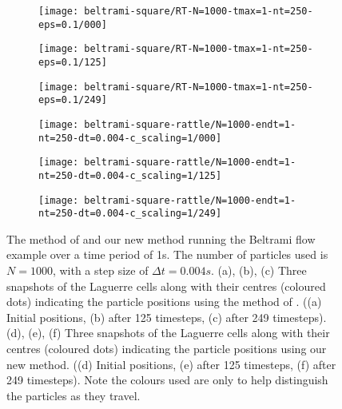 \documentclass[11pt, oneside]{article}   	%
\newcommand{\dt}{\Delta t}
\begin{document}
\begin{figure}[H]
     \begin{subfigure}[t]{0.25\textwidth}
        \centering
        \texttt{[image: beltrami-square/RT-N=1000-tmax=1-nt=250-eps=0.1/000]}
        \caption{} \label{fig:beltrami-flow-000-q}
    \end{subfigure}
    \begin{subfigure}[t]{0.25\textwidth}
        \centering
        \texttt{[image: beltrami-square/RT-N=1000-tmax=1-nt=250-eps=0.1/125]}
        \caption{} \label{fig:beltrami-flow-125-q}
    \end{subfigure}
   \begin{subfigure}[t]{0.25\textwidth}
        \centering
	\texttt{[image: beltrami-square/RT-N=1000-tmax=1-nt=250-eps=0.1/249]}
        \caption{} \label{fig:beltrami-flow-249-q}
    \end{subfigure}
   \begin{subfigure}[t]{0.25\textwidth}
        \centering
        \texttt{[image: beltrami-square-rattle/N=1000-endt=1-nt=250-dt=0.004-c\_scaling=1/000]}
        \caption{} \label{fig:beltrami-flow-000}
    \end{subfigure}
   \begin{subfigure}[t]{0.25\textwidth}
        \centering
        \texttt{[image: beltrami-square-rattle/N=1000-endt=1-nt=250-dt=0.004-c\_scaling=1/125]}
        \caption{} \label{fig:beltrami-flow-125}
    \end{subfigure}
   \begin{subfigure}[t]{0.25\textwidth}
        \centering
	\texttt{[image: beltrami-square-rattle/N=1000-endt=1-nt=250-dt=0.004-c\_scaling=1/249]}
        \caption{} \label{fig:beltrami-flow-249}
    \end{subfigure}
\centering
\caption{The method of \cite{gallouet2016lagrangian} and our new method running the Beltrami flow example over a time period of 1s. The number of particles used is \(N = 1000\), with a step size of \(\dt = 0.004s\). (a), (b), (c) Three snapshots of the Laguerre cells along with their centres (coloured dots) indicating the particle positions using the method of \cite{gallouet2016lagrangian}. ((a) Initial positions, (b) after 125 timesteps, (c) after 249 timesteps). (d), (e), (f) Three snapshots of the Laguerre cells along with their centres (coloured dots) indicating the particle positions using our new method. ((d) Initial positions, (e) after 125 timesteps, (f) after 249 timesteps). Note the colours used are only to help distinguish the particles as they travel.}
\centering
\label{fig:beltrami-flow}
\end{figure}
 
\end{document}
